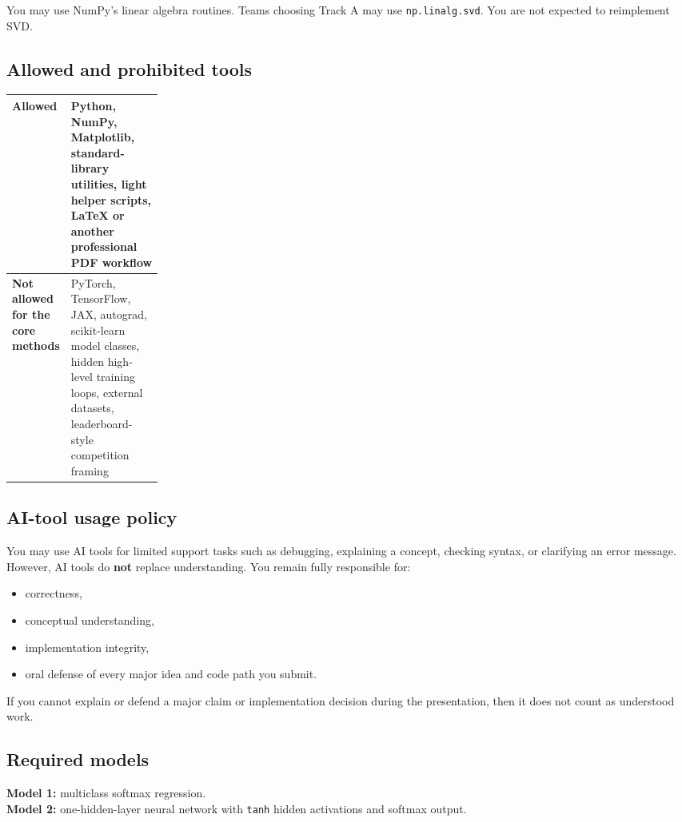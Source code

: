\documentclass[11pt]{article}
\begin{document}
You may use NumPy's linear algebra routines. Teams choosing Track A may use \verb|np.linalg.svd|. You are not expected to reimplement SVD.

\subsection{Allowed and prohibited tools}

\begin{tabularx}{\linewidth}{>{\raggedright\arraybackslash}p{0.22\linewidth} >{\raggedright\arraybackslash}X}
\toprule
\textbf{Allowed} & Python, NumPy, Matplotlib, standard-library utilities, light helper scripts, LaTeX or another professional PDF workflow \\
\midrule
\textbf{Not allowed for the core methods} & PyTorch, TensorFlow, JAX, autograd, scikit-learn model classes, hidden high-level training loops, external datasets, leaderboard-style competition framing \\
\bottomrule
\end{tabularx}

\subsection{AI-tool usage policy}

You may use AI tools for limited support tasks such as debugging, explaining a concept, checking syntax, or clarifying an error message. However, AI tools do \textbf{not} replace understanding. You remain fully responsible for:

\begin{itemize}
    \item correctness,
    \item conceptual understanding,
    \item implementation integrity,
    \item oral defense of every major idea and code path you submit.
\end{itemize}

If you cannot explain or defend a major claim or implementation decision during the presentation, then it does not count as understood work.

\subsection{Required models}

\textbf{Model 1:} multiclass softmax regression. \\
\textbf{Model 2:} one-hidden-layer neural network with \verb|tanh| hidden activations and softmax output.
\end{document}
